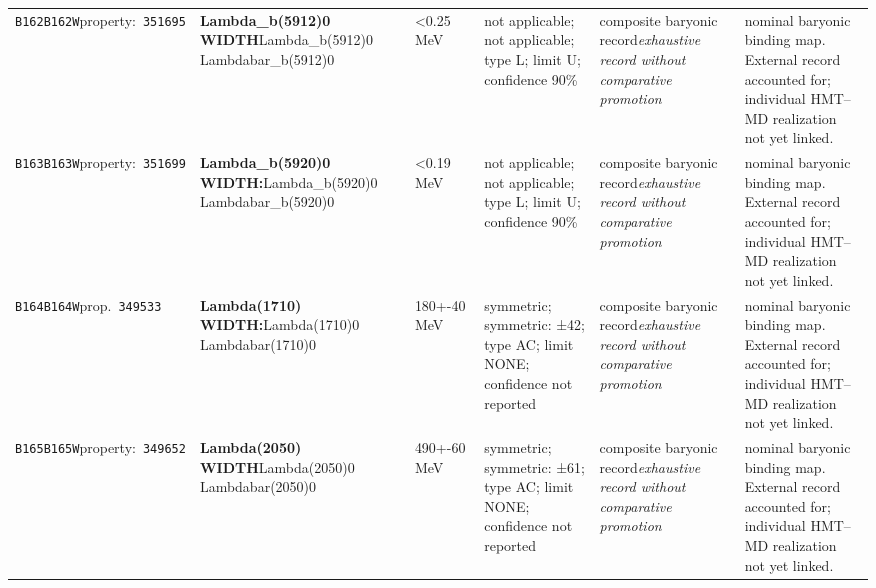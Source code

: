 \begin{landscape}
\begin{longtable}{L{1.85cm}L{4.45cm}L{2.35cm}L{4.05cm}L{3.35cm}L{7.15cm}}
\texttt{B162}\newline \texttt{B162W}\newline property:\ \texttt{351695} & \textbf{Lambda\_\allowbreak{}b(5912)0 WIDTH}\newline Lambda\_\allowbreak{}b(5912)0 \textbar{}\allowbreak{} Lambdabar\_\allowbreak{}b(5912)0 & \textless{}0.25\,MeV & not applicable; not applicable; type L; limit U; confidence 90\% & composite baryonic record\newline \emph{exhaustive record without comparative promotion} & nominal baryonic binding map. External record accounted for; individual HMT--MD realization not yet linked. \\
\texttt{B163}\newline \texttt{B163W}\newline property:\ \texttt{351699} & \textbf{Lambda\_\allowbreak{}b(5920)0 WIDTH:}\newline Lambda\_\allowbreak{}b(5920)0 \textbar{}\allowbreak{} Lambdabar\_\allowbreak{}b(5920)0 & \textless{}0.19\,MeV & not applicable; not applicable; type L; limit U; confidence 90\% & composite baryonic record\newline \emph{exhaustive record without comparative promotion} & nominal baryonic binding map. External record accounted for; individual HMT--MD realization not yet linked. \\
\texttt{B164}\newline \texttt{B164W}\newline prop.\ \texttt{349533} & \textbf{Lambda(1710) WIDTH:}\newline Lambda(1710)0 \textbar{}\allowbreak{} Lambdabar(1710)0 & 180+-40\,MeV & symmetric; symmetric: ±42; type AC; limit NONE; confidence not reported & composite baryonic record\newline \emph{exhaustive record without comparative promotion} & nominal baryonic binding map. External record accounted for; individual HMT--MD realization not yet linked. \\
\texttt{B165}\newline \texttt{B165W}\newline property:\ \texttt{349652} & \textbf{Lambda(2050) WIDTH}\newline Lambda(2050)0 \textbar{}\allowbreak{} Lambdabar(2050)0 & 490+-60\,MeV & symmetric; symmetric: ±61; type AC; limit NONE; confidence not reported & composite baryonic record\newline \emph{exhaustive record without comparative promotion} & nominal baryonic binding map. External record accounted for; individual HMT--MD realization not yet linked. \\

\end{longtable}
\end{landscape}
